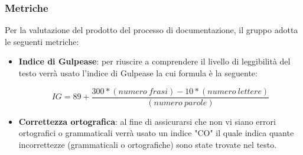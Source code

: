 \subsubsection{Metriche}
Per la valutazione del prodotto del processo di documentazione, il gruppo adotta le seguenti metriche:
\begin{itemize}
	\item \textbf{Indice di Gulpease}: per riuscire a comprendere il livello di leggibilità del testo verrà usato l'indice di Gulpease la cui formula è la seguente:
\begin{center}
\[IG=89+\frac{300*(numero \ frasi)-10*(numero \ lettere)}{(numero \ parole)}\]
\end{center}
	\item \textbf{Correttezza ortografica}: al fine di assicurarsi che non vi siano errori ortografici o grammaticali verrà usato un indice "CO" il quale indica quante incorrettezze (grammaticali o ortografiche) sono state trovate nel testo.
\end{itemize}


 